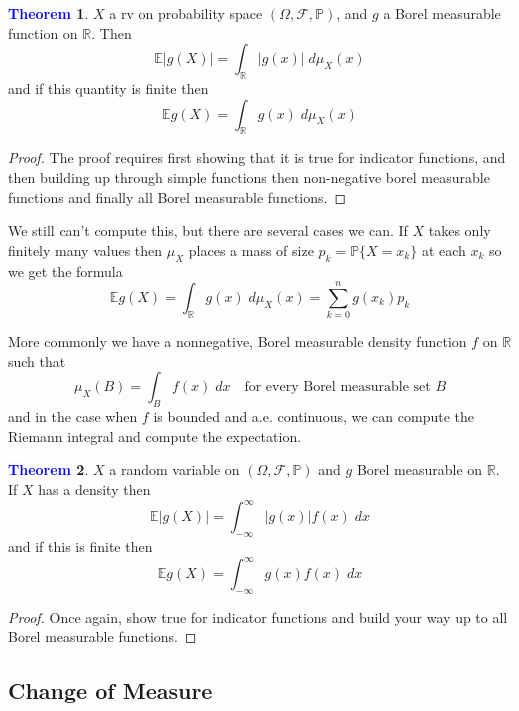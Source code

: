 \documentclass[11pt]{article}
\theoremstyle{definition}
\theoremstyle{definition}
\newcommand{\R}[0]{\mathbb{R}}
\newtheorem{theorem}{\textcolor{blue}{Theorem}}
\theoremstyle{definition}
\theoremstyle{remark}
\begin{document}
\begin{theorem}
    $X$ a rv on probability space $(\Omega, \mathcal{F}, \mathbb{P})$, and $g$ a Borel measurable function on $\R$.
    Then
    \[
        \mathbb{E} |g(X)| = \int_{\R} |g(x)| \; d\mu_X(x)
    \] 
    and if this quantity is finite then
    \[
        \mathbb{E} g(X) = \int_{\R} g(x) \; d\mu_X(x)
    \] 
\end{theorem}
\begin{proof}
    The proof requires first showing that it is true for indicator functions, and then building up through
    simple functions then non-negative borel measurable functions and finally all Borel measurable functions. \qedhere
\end{proof}

We still can't compute this, but there are several cases we can. If $X$ takes only finitely many values then
$\mu_X$ places a mass of size $p_k = \mathbb{P}\{X = x_k\}$ at each $x_k$ so we get the formula
\[
    \mathbb{E}g(X) = \int_{\R} g(x) \;d\mu_X(x) = \sum_{k = 0}^n g(x_k) p_k
\]     

More commonly we have a nonnegative, Borel measurable density function $f$ on $\R$ such that 
\[
    \mu_X(B) = \int_B f(x) \; dx \quad \text{for every Borel measurable set } B
\]   
and in the case when $f$ is bounded and a.e. continuous, we can compute the Riemann integral and compute the expectation.

\begin{theorem}
    $X$ a random variable on $(\Omega, \mathcal{F}, \mathbb{P})$ and $g$ Borel measurable on $\R$. If $X$ has a density then
    \[
        \mathbb{E} |g(X)| = \int_{-\infty}^\infty |g(x)| f(x) \; dx
    \]     
    and if this is finite then
    \[
        \mathbb{E} g(X) = \int_{-\infty}^\infty g(x) f(x) \; dx
    \]     
\end{theorem}
\begin{proof}
    Once again, show true for indicator functions and build your way up to all Borel measurable functions.
\end{proof}

\subsection{Change of Measure}
\end{document}
